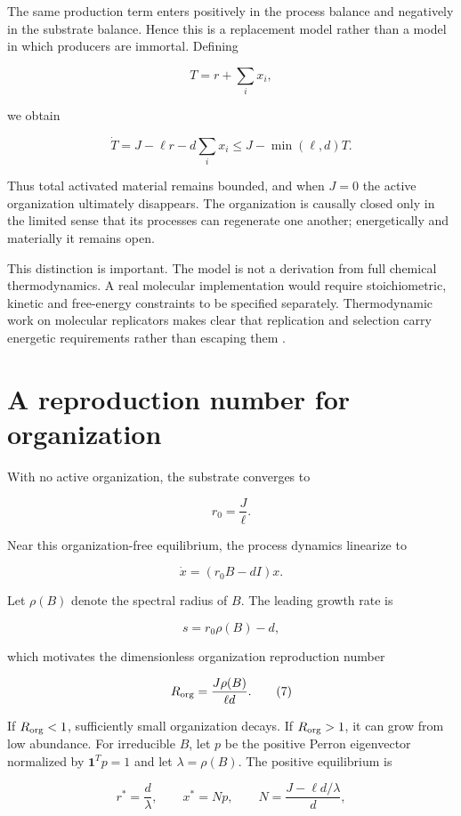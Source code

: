 \documentclass[11pt,a4paper]{article}
\begin{document}
The same production term enters positively in the process balance and
negatively in the substrate balance. Hence this is a replacement model
rather than a model in which producers are immortal. Defining

\[
T = r + \sum_i x_i,
\]

we obtain

\[
\dot{T} = J - \ell r - d\sum_i x_i \leq J - \min(\ell, d)T.
\]

Thus total activated material remains bounded, and when \(J = 0\) the
active organization ultimately disappears. The organization is causally
closed only in the limited sense that its processes can regenerate one
another; energetically and materially it remains open.

This distinction is important. The model is not a derivation from full
chemical thermodynamics. A real molecular implementation would require
stoichiometric, kinetic and free-energy constraints to be specified
separately. Thermodynamic work on molecular replicators makes clear that
replication and selection carry energetic requirements rather than
escaping them \citep{Kolchinsky2025}.

\section{A reproduction number for
organization}\label{a-reproduction-number-for-organization}

With no active organization, the substrate converges to

\[
r_0 = \frac{J}{\ell}.
\]

Near this organization-free equilibrium, the process dynamics linearize
to

\[
\dot{x} = (r_0 B - dI)x.
\]

Let \(\rho(B)\) denote the spectral radius of \(B\). The leading growth
rate is

\[
s = r_0 \rho(B) - d,
\]

which motivates the dimensionless organization reproduction number

\[
R_{\rm org} = \frac{J\rho(B)}{\ell d}. \tag{7}
\]

If \(R_{\rm org} < 1\), sufficiently small organization decays. If
\(R_{\rm org} > 1\), it can grow from low abundance. For irreducible
\(B\), let \(p\) be the positive Perron eigenvector normalized by
\(\mathbf{1}^T p = 1\) and let \(\lambda = \rho(B)\). The positive
equilibrium is

\[
r^* = \frac{d}{\lambda}, \qquad x^* = Np, \qquad N = \frac{J - \ell d/\lambda}{d},
\]
\end{document}
